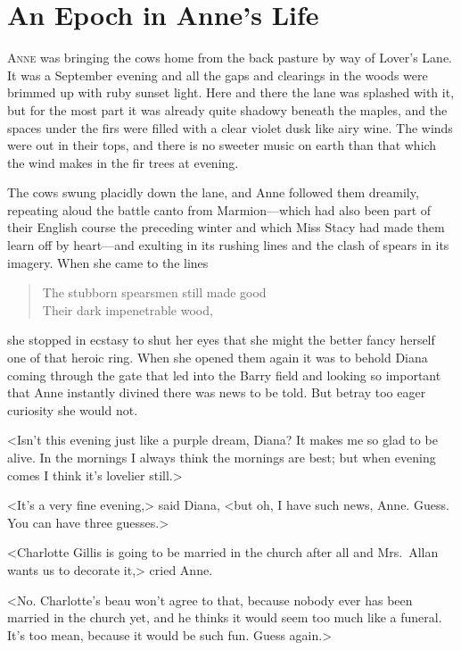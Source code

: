 \chapter{An Epoch in Anne's Life}

\lettrine[]{A}{nne} was bringing the cows home from the back pasture by way of Lover's Lane. It was a September evening and all the gaps and clearings in the woods were brimmed up with ruby sunset light. Here and there the lane was splashed with it, but for the most part it was already quite shadowy beneath the maples, and the spaces under the firs were filled with a clear violet dusk like airy wine. The winds were out in their tops, and there is no sweeter music on earth than that which the wind makes in the fir trees at evening.

The cows swung placidly down the lane, and Anne followed them dreamily, repeating aloud the battle canto from Marmion—which had also been part of their English course the preceding winter and which Miss Stacy had made them learn off by heart—and exulting in its rushing lines and the clash of spears in its imagery. When she came to the lines

\begin{verse}
The stubborn spearsmen still made good\\
Their dark impenetrable wood,\\
\end{verse}

she stopped in ecstasy to shut her eyes that she might the better fancy herself one of that heroic ring. When she opened them again it was to behold Diana coming through the gate that led into the Barry field and looking so important that Anne instantly divined there was news to be told. But betray too eager curiosity she would not.

<Isn't this evening just like a purple dream, Diana? It makes me so glad to be alive. In the mornings I always think the mornings are best; but when evening comes I think it's lovelier still.>

<It's a very fine evening,> said Diana, <but oh, I have such news, Anne. Guess. You can have three guesses.>

<Charlotte Gillis is going to be married in the church after all and Mrs.~Allan wants us to decorate it,> cried Anne.

<No. Charlotte's beau won't agree to that, because nobody ever has been married in the church yet, and he thinks it would seem too much like a funeral. It's too mean, because it would be such fun. Guess again.>

